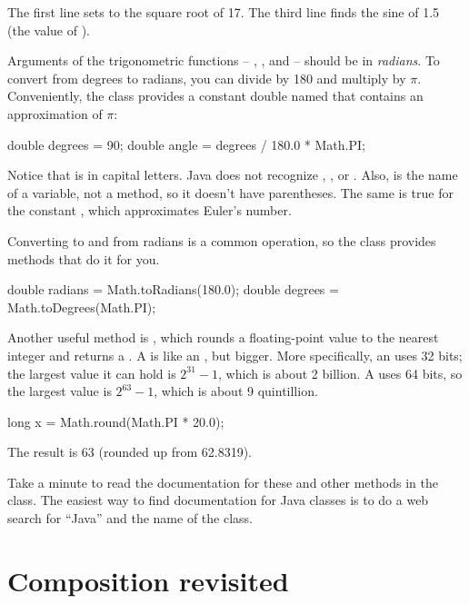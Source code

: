 The first line sets  to the square root of 17.
The third line finds the sine of 1.5 (the value of ).


Arguments of the trigonometric functions -- , , and  -- should be in {\em radians}.
To convert from degrees to radians, you can divide by 180 and multiply by $\pi$.
Conveniently, the  class provides a constant double named  that contains an approximation of $\pi$:

\begin{code}
double degrees = 90;
double angle = degrees / 180.0 * Math.PI;
\end{code}

Notice that  is in capital letters.
Java does not recognize , , or .
Also,  is the name of a variable, not a method, so it doesn't have parentheses.
The same is true for the constant , which approximates Euler's number.

Converting to and from radians is a common operation, so the  class provides methods that do it for you.

\begin{code}
double radians = Math.toRadians(180.0);
double degrees = Math.toDegrees(Math.PI);
\end{code}


Another useful method is , which rounds a floating-point value to the nearest integer and returns a .
A  is like an , but bigger.
More specifically, an  uses 32 bits; the largest value it can hold is $2^{31}-1$, which is about 2 billion.
A  uses 64 bits, so the largest value is $2^{63}-1$, which is about 9 quintillion.

\begin{code}
long x = Math.round(Math.PI * 20.0);
\end{code}

The result is 63 (rounded up from 62.8319).

Take a minute to read the documentation for these and other methods in the  class.
The easiest way to find documentation for Java classes is to do a web search for ``Java'' and the name of the class.


\section{Composition revisited}

